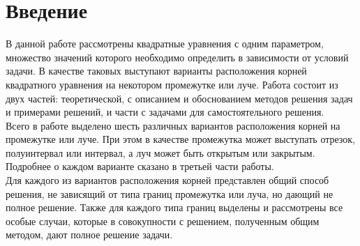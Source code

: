 \section {Введение}

В данной работе рассмотрены квадратные уравнения с одним параметром, множество значений которого 
необходимо определить в зависимости от условий задачи. В качестве таковых выступают варианты
расположения корней квадратного уравнения на некотором промежутке или луче. Работа состоит из двух
частей: теоретической, с описанием и обоснованием методов решения задач и примерами решений, и
части с задачами для самостоятельного решения.\\

Всего в работе выделено шесть различных вариантов расположения корней на промежутке или луче. При
этом в качестве промежутка может выступать отрезок, полуинтервал или интервал, а луч может быть
открытым или закрытым. Подробнее о каждом варианте сказано в третьей части работы.\\

Для каждого из вариантов расположения корней представлен общий способ решения, не зависящий от типа
границ промежутка или луча, но дающий не полное решение. Также для каждого типа границ выделены и
рассмотрены все особые случаи, которые в совокупности с решением, полученным общим методом, дают
полное решение задачи.
